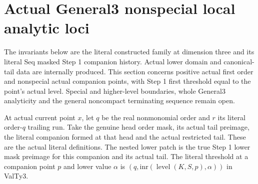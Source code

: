 \section{Actual General3 nonspecial local analytic loci}

The invariants below are the literal constructed family at dimension
three and its literal Seq masked Step 1 companion history. Actual lower
domain and canonical-tail data are internally produced. This section
concerns positive actual first order and nonspecial actual companion
points, with Step 1 first threshold equal to the point's actual level.
Special and higher-level boundaries, whole General3 analyticity and the
general noncompact terminating sequence remain open.

\begin{definition}
\label{hir:general-three-actual-companion-patch}
\leanok
At actual current point $x$, let $q$ be the real nonmonomial order and
$r$ its literal order-$q$ trailing run. Take the genuine head order
mask, its actual tail preimage, the literal companion formed at that
head and the actual restricted tail. These are the actual literal definitions. The nested lower patch is
the true Step 1 lower mask preimage for this companion and its actual tail.
The literal threshold at a companion point $p$ and lower value $\alpha$
is $(q,\mathrm{inr}(\operatorname{level}(K,S,p),\alpha))$ in ValTy3.
\end{definition}

